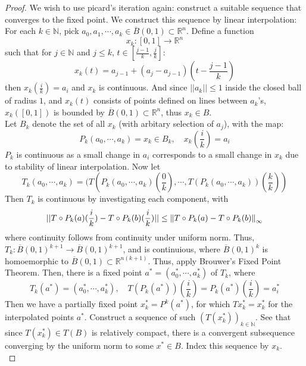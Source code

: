 \documentclass[a4paper, 12pt]{book}
\begin{document}
\begin{proof}
	We wish to use picard's iteration again: construct a suitable sequence that converges to the fixed point. We construct this sequence by linear interpolation:\\

	For each \( k\in \mathbb{N} \), pick \( a_0, a_1, \cdots , a_k \in \overline{B}(0,1)\subset \mathbb{R}^n\). Define a function \[
		x_k:[0,1]\to \mathbb{R}^n
	\]
	such that for \( j\in \mathbb{N} \) and \( j\leq k \), \( t\in[\frac{ j-1 }{ k } , \frac{ j }{ k } ] \):
	\[
		x_k(t)=a_{j-1} +(a_j-a_{j-1})(t-\frac{ j-1 }{ k } )
	\]
	then \( x_k(\frac{ i }{ k }) = a_i \) and \( x_k \) is continuous. And since \( ||a_k||\leq 1 \) inside the closed ball of radius \( 1 \), and \( x_k(t) \) consists of points defined on lines between \( a_k \)'s, \( x_k([0,1])\) is bounded by \( \overline{B}(0,1)\subset \mathbb{R}^n \), thus \( x_k\in B \).
	\\
	Let \( B_k \) denote the set of all \( x_k \) (with arbitary selection of \( a_j \)), with the map:
	\[
		P_k(a_0, \cdots, a_k)= x_k \in B_k, \quad x_k(\frac{ i }{ k }) =a_i
	\]
	\( P_k \) is continuous as a small change in \( a_i \) corresponds to a small change in \( x_k \) due to stability of linear interpolation. Now let
	\[
		T_k(a_0,\cdots, a_k)=(T(P_k (a_0,\cdots, a_k)(\frac{ 0 }{ k } ), \cdots , T(P_k(a_0, \cdots, a_k))(\frac{ k }{ k } ))
	\]
	Then \( T_k \) is continuous by investigating each component, with \[
		||T\circ P_k(a)(\frac{ i }{ k }) - T\circ P_k(b)(\frac{ i }{ k } )||\leq \norm{T\circ P_k(a)-T\circ P_k (b)} _\infty
	\]
	where continuity follows from continuity under uniform norm.
	Thus, \( T_k: \overline{B}(0,1) ^{k+1} \to \overline{B}(0,1)^{k+1}  \), and is continuious, where \( \overline{B}(0,1)^k \) is homoemorphic to \( \overline{B}(0,1) \subset \mathbb{R}^{n(k+1)}  \). Thus, apply Brouwer's Fixed Point Theorem. Then, there is a fixed point \( a^*=(a^*_0, \cdots, a^*_k) \) of \( T_k \), where \[
		T_k(a^*)=(a^*_0,\cdots, a^*_k), \quad T(P_k(a^*))(\frac{ i }{ k } )=P_k(a^*)(\frac{ i }{ k } )=a^*_i
	\]
	Then we have a partially fixed point \( x^*_k=P^k(a^*) \), for which \( Tx^*_k=x^*_k \) for the interpolated points $a^*$. Construct a sequence of such \( (T(x^*_k))_{k\in \mathbb{N}} \). See that since \( T(x_k^*)\in T(B)\) is relatively compact, there is a convergent subsequence converging by the uniform norm to some \( x^* \in B\). Index this sequence by \( x_k \). \\


\end{proof}
\end{document}
